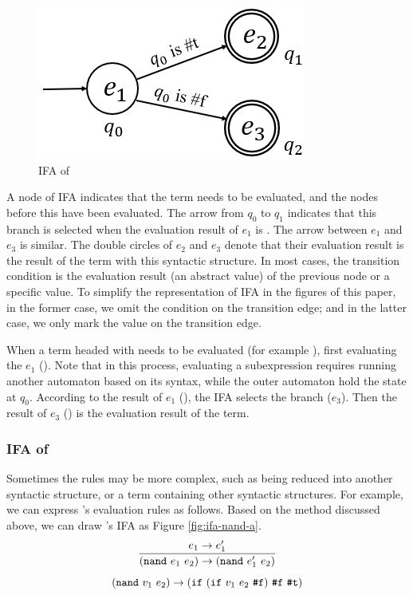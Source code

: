 \begin{figure}[t]
	\centering
	\includegraphics[scale=0.25]{images/ifa/ifa-if.png}
	\caption{IFA of }
	\label{fig:ifa-if}
\end{figure}

A node of IFA indicates that the term needs to be evaluated, and the nodes before this have been evaluated. The arrow from $q_0$ to $q_1$ indicates that this branch is selected when the evaluation result of $e_1$ is . The arrow between $e_1$ and $e_3$ is similar. The double circles of $e_2$ and $e_3$ denote that their evaluation result is the result of the term with this syntactic structure. In most cases, the transition condition is the evaluation result (an abstract value) of the previous node or a specific value. To simplify the representation of IFA in the figures of this paper, in the former case, we omit the condition on the transition edge; and in the latter case, we only mark the value on the transition edge.

When a term headed with  needs to be evaluated (for example ), first evaluating the $e_1$ (). Note that in this process, evaluating a subexpression requires running another automaton based on its syntax, while the outer automaton hold the state at $q_0$. According to the result of $e_1$ (), the IFA selects the branch ($e_3$). Then the result of $e_3$ () is the evaluation result of the term.

\subsubsection{IFA of }

Sometimes the rules may be more complex, such as being reduced into another syntactic structure, or a term containing other syntactic structures. For example, we can express 's evaluation rules as follows. Based on the method discussed above, we can draw 's IFA as Figure \ref{fig:ifa-nand-a}.
\[
\infer{(\m{nand}~e_1~e_2) \to (\m{nand}~e_1'~e_2)}{e_1 \to e_1'}
\]\[
(\mbox{\tt nand}~v_1~e_2) \to (\mbox{\tt if}~(\mbox{\tt if}~v_1~e_2~\mbox{\tt \#f})~\mbox{\tt \#f}~\mbox{\tt \#t})
\]

